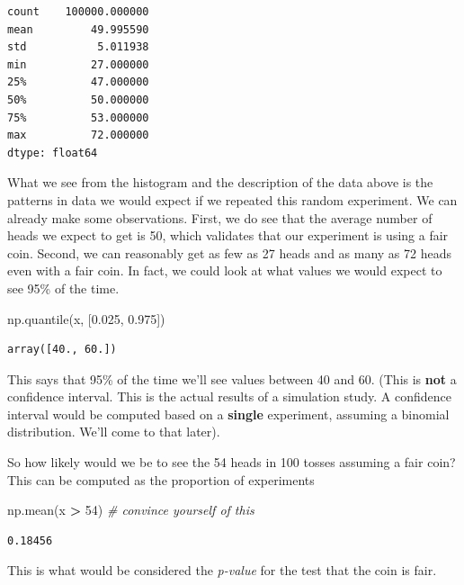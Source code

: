 \documentclass[
  letterpaper,
]{scrbook}
\newenvironment{Shaded}{\begin{snugshade}}{\end{snugshade}}
\newcommand{\CommentTok}[1]{\textcolor[rgb]{0.56,0.35,0.01}{\textit{#1}}}
\newcommand{\DecValTok}[1]{\textcolor[rgb]{0.00,0.00,0.81}{#1}}
\newcommand{\FloatTok}[1]{\textcolor[rgb]{0.00,0.00,0.81}{#1}}
\newcommand{\NormalTok}[1]{#1}
\newcommand{\OperatorTok}[1]{\textcolor[rgb]{0.81,0.36,0.00}{\textbf{#1}}}
\begin{document}
\begin{verbatim}
count    100000.000000
mean         49.995590
std           5.011938
min          27.000000
25%          47.000000
50%          50.000000
75%          53.000000
max          72.000000
dtype: float64
\end{verbatim}

What we see from the histogram and the description of the data above is the patterns in data we would expect if we repeated this random experiment. We can already make some observations. First, we do see that the average number of heads we expect to get is 50, which validates that our experiment is using a fair coin. Second, we can reasonably get as few as 27 heads and as many as 72 heads even with a fair coin. In fact, we could look at what values we would expect to see 95\% of the time.

\begin{Shaded}
\begin{Highlighting}[]
\NormalTok{np.quantile(x, [}\FloatTok{0.025}\NormalTok{, }\FloatTok{0.975}\NormalTok{])}
\end{Highlighting}
\end{Shaded}

\begin{verbatim}
array([40., 60.])
\end{verbatim}

This says that 95\% of the time we'll see values between 40 and 60. (This is \textbf{not} a confidence interval. This is the actual results of a simulation study. A confidence interval would be computed based on a \textbf{single} experiment, assuming a binomial distribution. We'll come to that later).

So how likely would we be to see the 54 heads in 100 tosses assuming a fair coin? This can be computed as the proportion of experiments

\begin{Shaded}
\begin{Highlighting}[]
\NormalTok{np.mean(x }\OperatorTok{>} \DecValTok{54}\NormalTok{) }\CommentTok{# convince yourself of this}
\end{Highlighting}
\end{Shaded}

\begin{verbatim}
0.18456
\end{verbatim}

This is what would be considered the \emph{p-value} for the test that the coin is fair.
\end{document}
